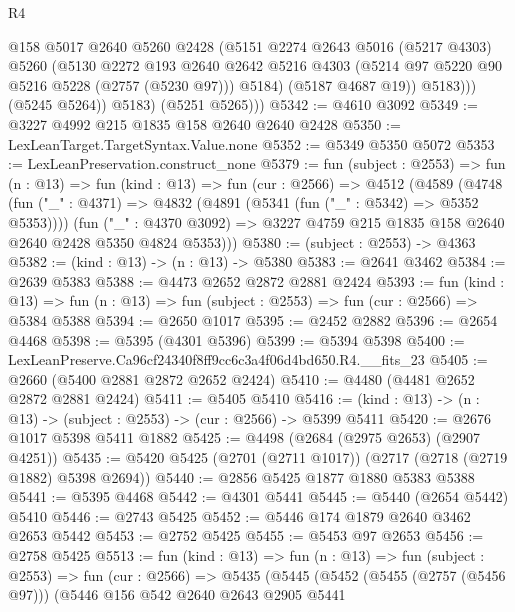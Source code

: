 \begin{lexlean}{R4}
\begin{coremodule}
                  @158
                  @5017
                  @2640
                  @5260
                  @2428
                  (@5151
                    @2274
                    @2643
                    @5016
                    (@5217 @4303)
                    @5260
                    (@5130
                      @2272
                      @193
                      @2640
                      @2642
                      @5216
                      @4303
                      (@5214 @97 @5220 @90 @5216 @5228 (@2757 (@5230 @97)))
                      @5184)
                    (@5187 @4687 @19))
                  @5183)))
            (@5245 @5264))
          @5183)
        (@5251 @5265)))
@5342 := @4610 @3092
@5349 := @3227 @4992 @215 @1835 @158 @2640 @2640 @2428
@5350 := LexLeanTarget.TargetSyntax.Value.none
@5352 := @5349 @5350 @5072
@5353 := LexLeanPreservation.construct_none
@5379 := fun (subject : @2553) =>
  fun (n : @13) =>
  fun (kind : @13) =>
  fun (cur : @2566) =>
  @4512
    (@4589
      (@4748
        (fun ("_" : @4371) => @4832 (@4891 (@5341 (fun ("_" : @5342) => @5352 @5353))))
        (fun ("_" : @4370 @3092) =>
        @3227 @4759 @215 @1835 @158 @2640 @2640 @2428 @5350 @4824 @5353)))
@5380 := (subject : @2553) -> @4363
@5382 := (kind : @13) -> (n : @13) -> @5380
@5383 := @2641 @3462
@5384 := @2639 @5383
@5388 := @4473 @2652 @2872 @2881 @2424
@5393 := fun (kind : @13) =>
  fun (n : @13) => fun (subject : @2553) => fun (cur : @2566) => @5384 @5388
@5394 := @2650 @1017
@5395 := @2452 @2882
@5396 := @2654 @4468
@5398 := @5395 (@4301 @5396)
@5399 := @5394 @5398
@5400 := LexLeanPreserve.Ca96cf24340f8ff9cc6c3a4f06d4bd650.R4.__fits_23
@5405 := @2660 (@5400 @2881 @2872 @2652 @2424)
@5410 := @4480 (@4481 @2652 @2872 @2881 @2424)
@5411 := @5405 @5410
@5416 := (kind : @13) -> (n : @13) -> (subject : @2553) -> (cur : @2566) -> @5399 @5411
@5420 := @2676 @1017 @5398 @5411 @1882
@5425 := @4498 (@2684 (@2975 @2653) (@2907 @4251))
@5435 := @5420 @5425 (@2701 (@2711 @1017)) (@2717 (@2718 (@2719 @1882) @5398 @2694))
@5440 := @2856 @5425 @1877 @1880 @5383 @5388
@5441 := @5395 @4468
@5442 := @4301 @5441
@5445 := @5440 (@2654 @5442) @5410
@5446 := @2743 @5425
@5452 := @5446 @174 @1879 @2640 @3462 @2653 @5442
@5453 := @2752 @5425
@5455 := @5453 @97 @2653
@5456 := @2758 @5425
@5513 := fun (kind : @13) =>
  fun (n : @13) =>
  fun (subject : @2553) =>
  fun (cur : @2566) =>
  @5435
    (@5445
      (@5452
        (@5455 (@2757 (@5456 @97)))
        (@5446
          @156
          @542
          @2640
          @2643
          @2905
          @5441

\end{coremodule}
\end{lexlean}
